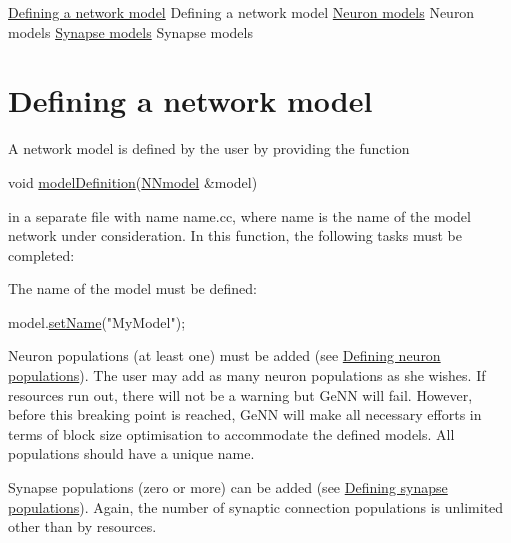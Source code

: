 \hyperlink{sect1}{Defining a network model} Defining a network model \hyperlink{sect2}{Neuron models} Neuron models \hyperlink{sect3}{Synapse models} Synapse models \hypertarget{sect1}{}\section{Defining a network model}\label{sect1}
A network model is defined by the user by providing the function 
\begin{DoxyCode}
\textcolor{keywordtype}{void} \hyperlink{tmp_2model_2MBody__userdef_8cc_a9aeaa0a22980484b2c472564fc9f686e}{modelDefinition}(\hyperlink{classNNmodel}{NNmodel} &model) 
\end{DoxyCode}
 in a separate file with name {\ttfamily name.\+cc}, where {\ttfamily name} is the name of the model network under consideration. In this function, the following tasks must be completed\+:
\begin{DoxyEnumerate}
\item The name of the model must be defined\+: 
\begin{DoxyCode}
model.\hyperlink{classNNmodel_a757eff2a5877688e6e5492726df035ee}{setName}(\textcolor{stringliteral}{"MyModel"});
\end{DoxyCode}

\item Neuron populations (at least one) must be added (see \hyperlink{sect1_subsect11}{Defining neuron populations}). The user may add as many neuron populations as she wishes. If resources run out, there will not be a warning but Ge\+N\+N will fail. However, before this breaking point is reached, Ge\+N\+N will make all necessary efforts in terms of block size optimisation to accommodate the defined models. All populations should have a unique name.
\item Synapse populations (zero or more) can be added (see \hyperlink{sect1_subsect12}{Defining synapse populations}). Again, the number of synaptic connection populations is unlimited other than by resources.
\end{DoxyEnumerate}

